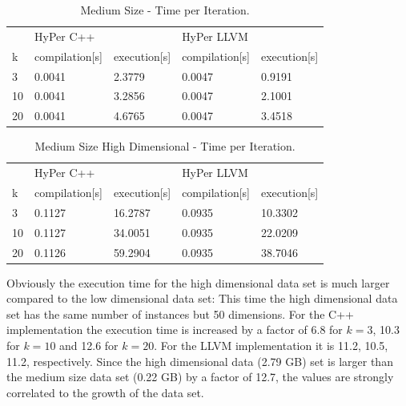 \begin{table}[htsb]
  \caption[Medium Size - Time per Iteration]{Medium Size - Time per Iteration.}
  \label{tab:med_serial}
  \centering
  \begin{tabular}{l l l l l}
    \toprule
      & HyPer C++ & & HyPer LLVM & \\
      k & compilation[s] & execution[s] & compilation[s] & execution[s] \\
    \midrule
      3  & 0.0041 & 2.3779 & 0.0047 & 0.9191 \\
      10 & 0.0041 & 3.2856 & 0.0047 & 2.1001 \\
      20 & 0.0041 & 4.6765 & 0.0047 & 3.4518 \\
    \bottomrule
  \end{tabular}
\end{table}


\begin{table}[htsb]
  \caption[Medium Size High Dimensional - Time per Iteration]{Medium Size High Dimensional - Time per Iteration.}
  \label{tab:med_hd_serial}
  \centering
  \begin{tabular}{l l l l l}
    \toprule
      & HyPer C++ & & HyPer LLVM & \\
      k & compilation[s] & execution[s] & compilation[s] & execution[s] \\
    \midrule
      3  & 0.1127 & 16.2787 & 0.0935 & 10.3302 \\
      10 & 0.1127 & 34.0051 & 0.0935 & 22.0209 \\
      20 & 0.1126 & 59.2904 & 0.0935 & 38.7046 \\
    \bottomrule
  \end{tabular}
\end{table}

Obviously the execution time for the high dimensional data set is much larger compared to the low dimensional data set: This time the high dimensional data set has the same number of instances but 50 dimensions. For the C++ implementation the execution time is increased by a factor of 6.8 for $k = 3$, 10.3 for $k = 10$ and 12.6 for $k = 20$. For the LLVM implementation it is 11.2, 10.5, 11.2, respectively. Since the high dimensional data (2.79 GB) set is larger than the medium size data set (0.22 GB) by a factor of 12.7, the values are strongly correlated to the growth of the data set.

